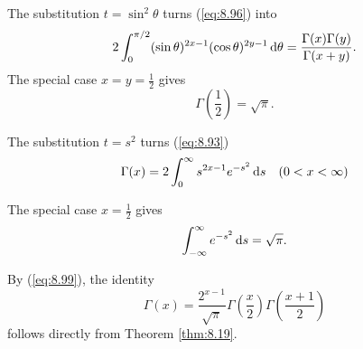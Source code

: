 \begin{thm}
    \label{thm:8.21}
    The substitution $t = \sin^2 \theta$ turns (\ref{eq:8.96}) into
    \begin{equation}
        \label{eq:8.98}
        2 \int_{0}^{\pi/2} 
        (\sin \theta)^{2x-1}
        (\cos \theta)^{2y-1} 
        \d \theta = 
        \frac{\Gamma(x)\Gamma(y)}{\Gamma(x+y)}.
    \end{equation}
    The special case $x=y=\frac{1}{2}$ gives 
    \begin{equation}
        \label{eq:8.99}
        \Gamma\left( \frac{1}{2} \right) = \sqrt{\pi} .
    \end{equation}

    The substitution $t=s^2$ turns (\ref{eq:8.93})
    \begin{equation}
        \label{eq:8.100}
        \Gamma(x) = 2 \int_{0}^{\infty} s^{2x-1} e^{-s^2} \d s
        \quad 
        (0 < x < \infty)
    \end{equation}

    The special case $x=\frac{1}{2}$ gives 
    \begin{equation}
        \label{eq:8.101}
        \int_{-\infty}^{\infty} e^{-s^2} \d s = \sqrt{\pi} .
    \end{equation}

    By (\ref{eq:8.99}), the identity 
    \begin{equation}
        \label{eq:8.102}
        \Gamma(x) = \frac{2^{x-1}}{\sqrt{\pi}} 
        \Gamma \left( \frac{x}{2} \right)
        \Gamma \left( \frac{x+1}{2} \right)
    \end{equation}
    follows directly from Theorem \ref{thm:8.19}.
\end{thm}

